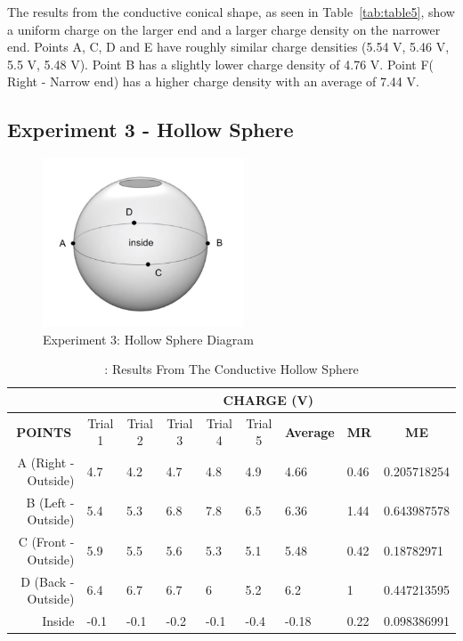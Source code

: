 The results from the conductive conical shape, as seen in Table~\ref{tab:table5}, show a uniform charge on the larger end and a larger charge density on the narrower end. Points A, C, D and E have roughly similar charge densities (5.54 V, 5.46 V, 5.5 V, 5.48 V). Point B has a slightly lower charge density of 4.76 V. Point F( Right - Narrow end) has a higher charge density with an average of 7.44 V.
    
\newpage

\subsection{Experiment 3 - Hollow Sphere}

\begin{figure}[h]
    \centering
    \includegraphics[height=5cm]{photos/experiment3image.png} %
    \caption{Experiment 3: Hollow Sphere Diagram}
    \label{fig:experiment2}
\end{figure}

\begin{table}[h]
    \caption{\label{tab:table6}:  Results From The Conductive Hollow Sphere}
    \begin{tabular}{@{}rllllllll@{}}
    \toprule
    \multicolumn{1}{l}{} & \multicolumn{8}{c}{\textbf{CHARGE (V)}}                       \\ \midrule
    \multicolumn{1}{c}{\textbf{POINTS}} &
      \multicolumn{1}{c}{Trial 1} &
      \multicolumn{1}{c}{Trial 2} &
      \multicolumn{1}{c}{Trial 3} &
      \multicolumn{1}{c}{Trial 4} &
      \multicolumn{1}{c}{Trial 5} &
      \multicolumn{1}{c}{\textbf{Average}} &
      \multicolumn{1}{c}{\textbf{MR}} &
      \multicolumn{1}{c}{\textbf{ME}} \\
    A (Right - Outside)  & 4.7  & 4.2  & 4.7  & 4.8  & 4.9  & 4.66  & 0.46 & 0.205718254 \\
    B (Left - Outside)   & 5.4  & 5.3  & 6.8  & 7.8  & 6.5  & 6.36  & 1.44 & 0.643987578 \\
    C (Front - Outside)  & 5.9  & 5.5  & 5.6  & 5.3  & 5.1  & 5.48  & 0.42 & 0.18782971  \\
    D (Back - Outside)   & 6.4  & 6.7  & 6.7  & 6    & 5.2  & 6.2   & 1    & 0.447213595 \\
    Inside               & -0.1 & -0.1 & -0.2 & -0.1 & -0.4 & -0.18 & 0.22 & 0.098386991 \\ \bottomrule
    \end{tabular}
    \end{table}
    
